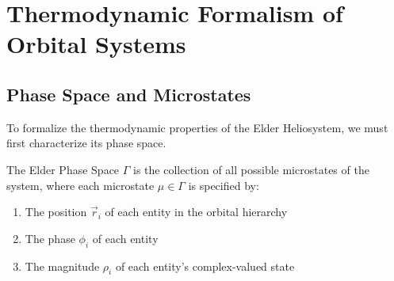 \section{Thermodynamic Formalism of Orbital Systems}

\subsection{Phase Space and Microstates}

To formalize the thermodynamic properties of the Elder Heliosystem, we must first characterize its phase space.

\begin{definition}
The Elder Phase Space $\Gamma$ is the collection of all possible microstates of the system, where each microstate $\mu \in \Gamma$ is specified by:
\begin{enumerate}
    \item The position $\vec{r}_i$ of each entity in the orbital hierarchy
    \item The phase $\phi_i$ of each entity
    \item The magnitude $\rho_i$ of each entity's complex-valued state
\end{enumerate}
\end{definition}

